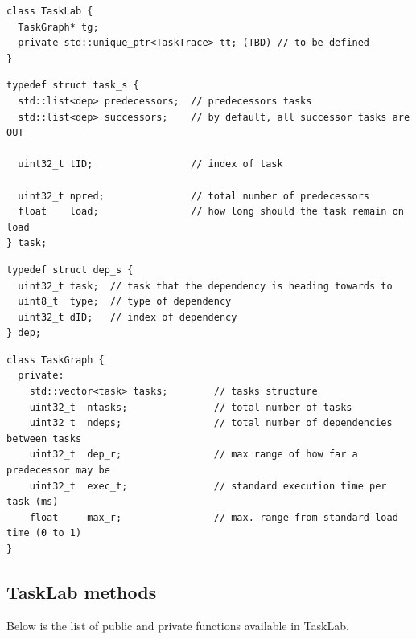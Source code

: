 
\begin{verbatim}
class TaskLab {
  TaskGraph* tg;
  private std::unique_ptr<TaskTrace> tt; (TBD) // to be defined
}
\end{verbatim}


\begin{verbatim}
typedef struct task_s {
  std::list<dep> predecessors;  // predecessors tasks
  std::list<dep> successors;    // by default, all successor tasks are OUT

  uint32_t tID;                 // index of task

  uint32_t npred;               // total number of predecessors
  float    load;                // how long should the task remain on load
} task;

\end{verbatim}


\begin{verbatim}
typedef struct dep_s {
  uint32_t task;  // task that the dependency is heading towards to
  uint8_t  type;  // type of dependency
  uint32_t dID;   // index of dependency
} dep;
\end{verbatim}

\begin{verbatim}
class TaskGraph {
  private:
    std::vector<task> tasks;        // tasks structure
    uint32_t  ntasks;               // total number of tasks
    uint32_t  ndeps;                // total number of dependencies between tasks
    uint32_t  dep_r;                // max range of how far a predecessor may be
    uint32_t  exec_t;               // standard execution time per task (ms)
    float     max_r;                // max. range from standard load time (0 to 1)
}
\end{verbatim}

\subsection{TaskLab methods}
Below is the list of public and private functions available in TaskLab.

